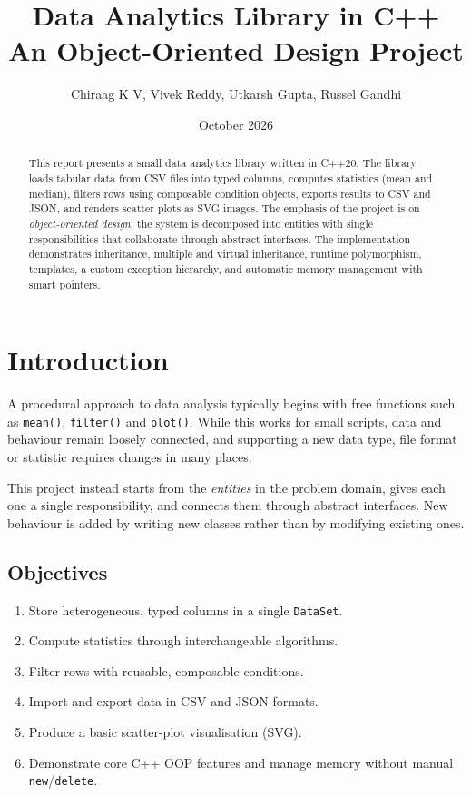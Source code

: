 \documentclass[11pt,a4paper]{article}
\title{\textbf{Data Analytics Library in C++}\\[4pt]
\large An Object-Oriented Design Project}
\author{Chiraag K V, Vivek Reddy, Utkarsh Gupta, Russel Gandhi}
\date{October 2026}
\newcommand{\code}[1]{\texttt{#1}}
\begin{document}
\maketitle

\begin{abstract}
This report presents a small data analytics library written in C++20. The library loads tabular data
from CSV files into typed columns, computes statistics (mean and median), filters rows using
composable condition objects, exports results to CSV and JSON, and renders scatter plots as SVG images.
The emphasis of the project is on \emph{object-oriented design}: the system is decomposed into
entities with single responsibilities that collaborate through abstract interfaces. The
implementation demonstrates inheritance, multiple and virtual inheritance, runtime polymorphism,
templates, a custom exception hierarchy, and automatic memory management with smart pointers.
\end{abstract}

\tableofcontents
\newpage

\section{Introduction}

A procedural approach to data analysis typically begins with free functions such as
\code{mean()}, \code{filter()} and \code{plot()}. While this works for small scripts, data and
behaviour remain loosely connected, and supporting a new data type, file format or statistic
requires changes in many places.

This project instead starts from the \emph{entities} in the problem domain, gives each one a
single responsibility, and connects them through abstract interfaces. New behaviour is added by
writing new classes rather than by modifying existing ones.

\subsection*{Objectives}
\begin{enumerate}[noitemsep]
  \item Store heterogeneous, typed columns in a single \code{DataSet}.
  \item Compute statistics through interchangeable algorithms.
  \item Filter rows with reusable, composable conditions.
  \item Import and export data in CSV and JSON formats.
  \item Produce a basic scatter-plot visualisation (SVG).
  \item Demonstrate core C++ OOP features and manage memory without manual \code{new}/\code{delete}.
\end{enumerate}
\end{document}
